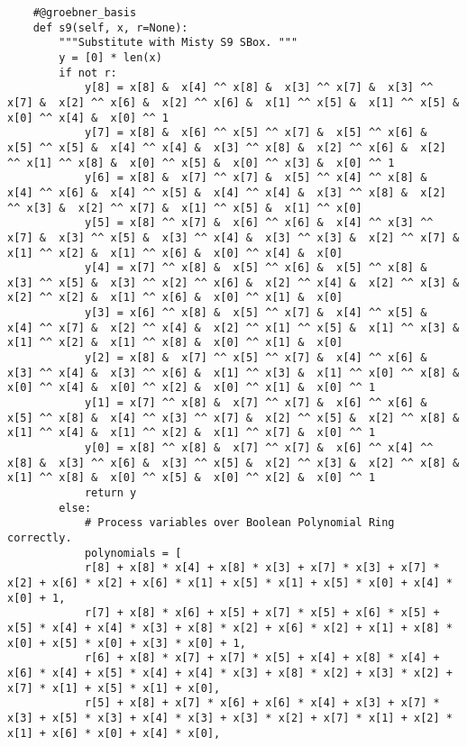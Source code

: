 \begin{lstlisting}
    #@groebner_basis
    def s9(self, x, r=None):
        """Substitute with Misty S9 SBox. """
        y = [0] * len(x)
        if not r:
            y[8] = x[8] &  x[4] ^^ x[8] &  x[3] ^^ x[7] &  x[3] ^^ x[7] &  x[2] ^^ x[6] &  x[2] ^^ x[6] &  x[1] ^^ x[5] &  x[1] ^^ x[5] &  x[0] ^^ x[4] &  x[0] ^^ 1
            y[7] = x[8] &  x[6] ^^ x[5] ^^ x[7] &  x[5] ^^ x[6] &  x[5] ^^ x[5] &  x[4] ^^ x[4] &  x[3] ^^ x[8] &  x[2] ^^ x[6] &  x[2] ^^ x[1] ^^ x[8] &  x[0] ^^ x[5] &  x[0] ^^ x[3] &  x[0] ^^ 1
            y[6] = x[8] &  x[7] ^^ x[7] &  x[5] ^^ x[4] ^^ x[8] &  x[4] ^^ x[6] &  x[4] ^^ x[5] &  x[4] ^^ x[4] &  x[3] ^^ x[8] &  x[2] ^^ x[3] &  x[2] ^^ x[7] &  x[1] ^^ x[5] &  x[1] ^^ x[0]
            y[5] = x[8] ^^ x[7] &  x[6] ^^ x[6] &  x[4] ^^ x[3] ^^ x[7] &  x[3] ^^ x[5] &  x[3] ^^ x[4] &  x[3] ^^ x[3] &  x[2] ^^ x[7] &  x[1] ^^ x[2] &  x[1] ^^ x[6] &  x[0] ^^ x[4] &  x[0]
            y[4] = x[7] ^^ x[8] &  x[5] ^^ x[6] &  x[5] ^^ x[8] &  x[3] ^^ x[5] &  x[3] ^^ x[2] ^^ x[6] &  x[2] ^^ x[4] &  x[2] ^^ x[3] &  x[2] ^^ x[2] &  x[1] ^^ x[6] &  x[0] ^^ x[1] &  x[0]
            y[3] = x[6] ^^ x[8] &  x[5] ^^ x[7] &  x[4] ^^ x[5] &  x[4] ^^ x[7] &  x[2] ^^ x[4] &  x[2] ^^ x[1] ^^ x[5] &  x[1] ^^ x[3] &  x[1] ^^ x[2] &  x[1] ^^ x[8] &  x[0] ^^ x[1] &  x[0]
            y[2] = x[8] &  x[7] ^^ x[5] ^^ x[7] &  x[4] ^^ x[6] &  x[3] ^^ x[4] &  x[3] ^^ x[6] &  x[1] ^^ x[3] &  x[1] ^^ x[0] ^^ x[8] &  x[0] ^^ x[4] &  x[0] ^^ x[2] &  x[0] ^^ x[1] &  x[0] ^^ 1
            y[1] = x[7] ^^ x[8] &  x[7] ^^ x[7] &  x[6] ^^ x[6] &  x[5] ^^ x[8] &  x[4] ^^ x[3] ^^ x[7] &  x[2] ^^ x[5] &  x[2] ^^ x[8] &  x[1] ^^ x[4] &  x[1] ^^ x[2] &  x[1] ^^ x[7] &  x[0] ^^ 1
            y[0] = x[8] ^^ x[8] &  x[7] ^^ x[7] &  x[6] ^^ x[4] ^^ x[8] &  x[3] ^^ x[6] &  x[3] ^^ x[5] &  x[2] ^^ x[3] &  x[2] ^^ x[8] &  x[1] ^^ x[8] &  x[0] ^^ x[5] &  x[0] ^^ x[2] &  x[0] ^^ 1
            return y
        else:
            # Process variables over Boolean Polynomial Ring correctly.
            polynomials = [
            r[8] + x[8] * x[4] + x[8] * x[3] + x[7] * x[3] + x[7] * x[2] + x[6] * x[2] + x[6] * x[1] + x[5] * x[1] + x[5] * x[0] + x[4] * x[0] + 1,
            r[7] + x[8] * x[6] + x[5] + x[7] * x[5] + x[6] * x[5] + x[5] * x[4] + x[4] * x[3] + x[8] * x[2] + x[6] * x[2] + x[1] + x[8] * x[0] + x[5] * x[0] + x[3] * x[0] + 1,
            r[6] + x[8] * x[7] + x[7] * x[5] + x[4] + x[8] * x[4] + x[6] * x[4] + x[5] * x[4] + x[4] * x[3] + x[8] * x[2] + x[3] * x[2] + x[7] * x[1] + x[5] * x[1] + x[0],
            r[5] + x[8] + x[7] * x[6] + x[6] * x[4] + x[3] + x[7] * x[3] + x[5] * x[3] + x[4] * x[3] + x[3] * x[2] + x[7] * x[1] + x[2] * x[1] + x[6] * x[0] + x[4] * x[0],

\end{lstlisting}
